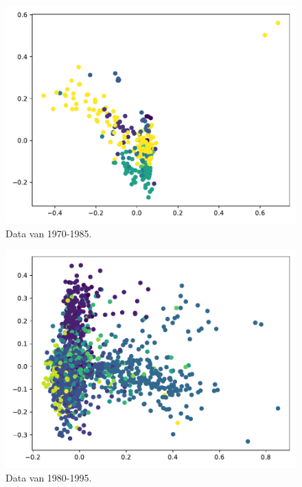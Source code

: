 \documentclass[a4paper,fontsize=11pt]{article}
\begin{document}
\begin{figure}[H]
  \centering
  \includegraphics[width=\textwidth]{pca_1970-1985.pdf}
  \caption{Data van 1970-1985.}
  \label{fig:1970}
\end{figure}

\begin{figure}[H]
  \centering
  \includegraphics[width=\textwidth]{pca_1980-1995.pdf}
  \caption{Data van 1980-1995.}
  \label{fig:1980}
\end{figure}
\end{document}
